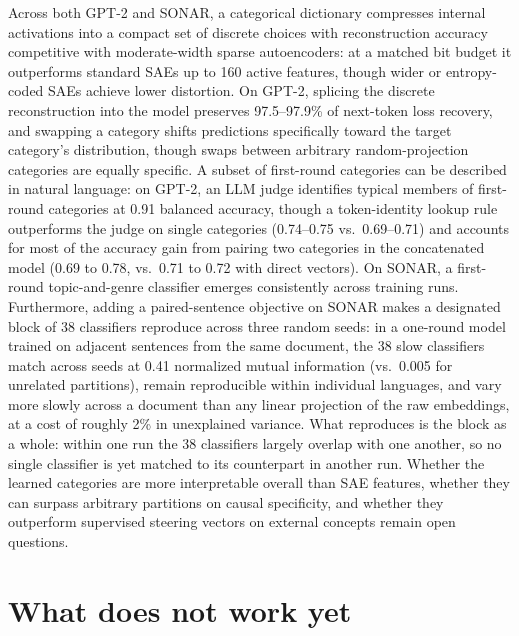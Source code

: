 \documentclass[11pt]{article}
\begin{document}
Across both GPT-2 and SONAR, a categorical dictionary compresses internal
activations into a compact set of discrete choices with reconstruction
accuracy competitive with moderate-width sparse autoencoders: at a matched
bit budget it outperforms standard SAEs up to 160 active features,
though wider or entropy-coded SAEs achieve lower distortion. On GPT-2,
splicing the discrete reconstruction into the model preserves 97.5--97.9\%
of next-token loss recovery, and swapping a category shifts predictions
specifically toward the target category's distribution, though swaps
between arbitrary random-projection categories are equally specific. A
subset of first-round categories can be described in natural language: on
GPT-2, an LLM judge identifies typical members of first-round categories
at 0.91 balanced accuracy, though a token-identity lookup rule outperforms
the judge on single categories (0.74--0.75 vs.\ 0.69--0.71) and accounts
for most of the accuracy gain from pairing two categories in the
concatenated model (0.69 to 0.78, vs.\ 0.71 to 0.72 with direct vectors).
On SONAR, a first-round topic-and-genre classifier emerges consistently
across training runs. Furthermore, adding a paired-sentence objective on
SONAR makes a designated block of 38 classifiers reproduce across three
random seeds: in a one-round model trained on adjacent sentences from the
same document, the 38 slow classifiers match across seeds at 0.41 normalized
mutual information (vs.\ 0.005 for unrelated partitions), remain
reproducible within individual languages, and vary more slowly across a
document than any linear projection of the raw embeddings, at a cost of
roughly 2\% in unexplained variance. What reproduces is the block as a
whole: within one run the 38 classifiers largely overlap with one
another, so no single classifier is yet matched to its counterpart in
another run. Whether the learned categories are
more interpretable overall than SAE features, whether they can surpass
arbitrary partitions on causal specificity, and whether they outperform
supervised steering vectors on external concepts remain open questions.

\section*{What does not work yet}
\end{document}
